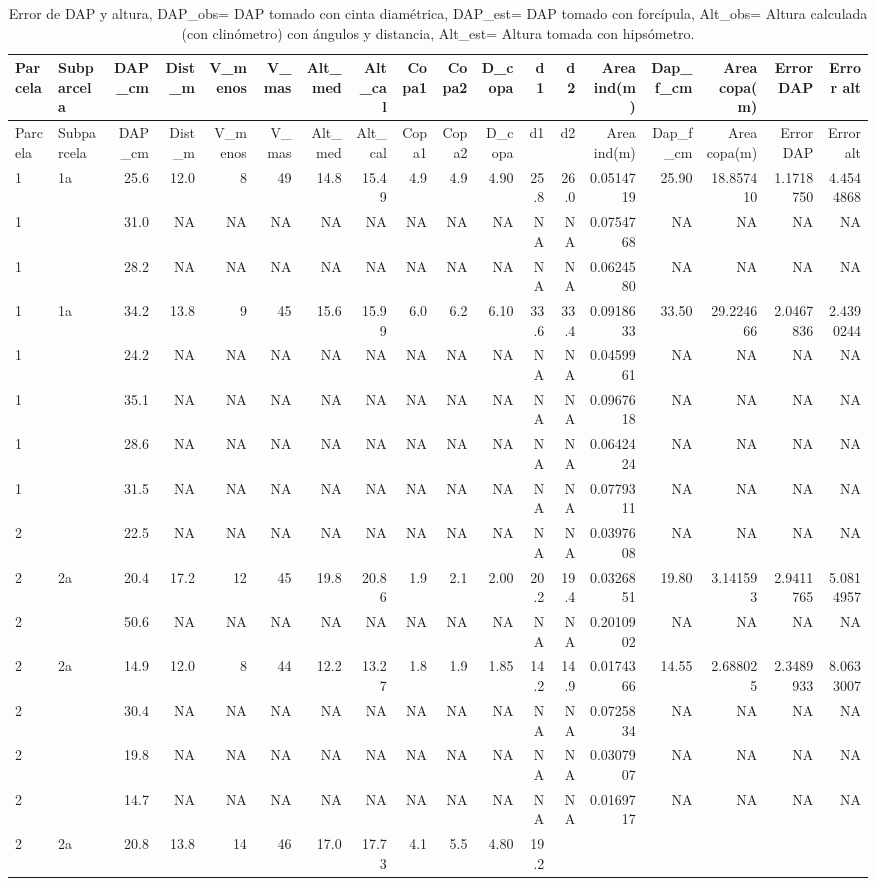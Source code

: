 \documentclass[letterpaper,9pt,twocolumn,twoside,]{pinp}
\begin{document}
\begin{longtable}[]{@{}llrrrrrrrrrrrrrrrr@{}}
\caption{Error de DAP y altura, DAP\_obs= DAP tomado con cinta
diamétrica, DAP\_est= DAP tomado con forcípula, Alt\_obs= Altura
calculada (con clinómetro) con ángulos y distancia, Alt\_est= Altura
tomada con hipsómetro.}\tabularnewline
\toprule
Parcela & Subparcela & DAP\_cm & Dist\_m & V\_menos & V\_mas & Alt\_med
& Alt\_cal & Copa1 & Copa2 & D\_copa & d1 & d2 & Area ind(m) &
Dap\_f\_cm & Area copa(m) & Error DAP & Error alt\tabularnewline
\midrule
\endfirsthead
\toprule
Parcela & Subparcela & DAP\_cm & Dist\_m & V\_menos & V\_mas & Alt\_med
& Alt\_cal & Copa1 & Copa2 & D\_copa & d1 & d2 & Area ind(m) &
Dap\_f\_cm & Area copa(m) & Error DAP & Error alt\tabularnewline
\midrule
\endhead
1 & 1a & 25.6 & 12.0 & 8 & 49 & 14.8 & 15.49 & 4.9 & 4.9 & 4.90 & 25.8 &
26.0 & 0.0514719 & 25.90 & 18.857410 & 1.1718750 &
4.4544868\tabularnewline
1 & & 31.0 & NA & NA & NA & NA & NA & NA & NA & NA & NA & NA & 0.0754768
& NA & NA & NA & NA\tabularnewline
1 & & 28.2 & NA & NA & NA & NA & NA & NA & NA & NA & NA & NA & 0.0624580
& NA & NA & NA & NA\tabularnewline
1 & 1a & 34.2 & 13.8 & 9 & 45 & 15.6 & 15.99 & 6.0 & 6.2 & 6.10 & 33.6 &
33.4 & 0.0918633 & 33.50 & 29.224666 & 2.0467836 &
2.4390244\tabularnewline
1 & & 24.2 & NA & NA & NA & NA & NA & NA & NA & NA & NA & NA & 0.0459961
& NA & NA & NA & NA\tabularnewline
1 & & 35.1 & NA & NA & NA & NA & NA & NA & NA & NA & NA & NA & 0.0967618
& NA & NA & NA & NA\tabularnewline
1 & & 28.6 & NA & NA & NA & NA & NA & NA & NA & NA & NA & NA & 0.0642424
& NA & NA & NA & NA\tabularnewline
1 & & 31.5 & NA & NA & NA & NA & NA & NA & NA & NA & NA & NA & 0.0779311
& NA & NA & NA & NA\tabularnewline
2 & & 22.5 & NA & NA & NA & NA & NA & NA & NA & NA & NA & NA & 0.0397608
& NA & NA & NA & NA\tabularnewline
2 & 2a & 20.4 & 17.2 & 12 & 45 & 19.8 & 20.86 & 1.9 & 2.1 & 2.00 & 20.2
& 19.4 & 0.0326851 & 19.80 & 3.141593 & 2.9411765 &
5.0814957\tabularnewline
2 & & 50.6 & NA & NA & NA & NA & NA & NA & NA & NA & NA & NA & 0.2010902
& NA & NA & NA & NA\tabularnewline
2 & 2a & 14.9 & 12.0 & 8 & 44 & 12.2 & 13.27 & 1.8 & 1.9 & 1.85 & 14.2 &
14.9 & 0.0174366 & 14.55 & 2.688025 & 2.3489933 &
8.0633007\tabularnewline
2 & & 30.4 & NA & NA & NA & NA & NA & NA & NA & NA & NA & NA & 0.0725834
& NA & NA & NA & NA\tabularnewline
2 & & 19.8 & NA & NA & NA & NA & NA & NA & NA & NA & NA & NA & 0.0307907
& NA & NA & NA & NA\tabularnewline
2 & & 14.7 & NA & NA & NA & NA & NA & NA & NA & NA & NA & NA & 0.0169717
& NA & NA & NA & NA\tabularnewline
2 & 2a & 20.8 & 13.8 & 14 & 46 & 17.0 & 17.73 & 4.1 & 5.5 & 4.80 & 19.2

\end{longtable}
\end{document}
